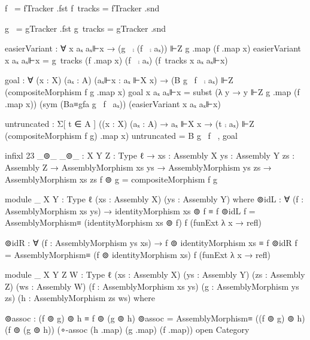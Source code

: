                              f~ = fTracker .fst
                             f~tracks = fTracker .snd

                             g~ = gTracker .fst
                             g~tracks = gTracker .snd

                             easierVariant : ∀ x aₓ aₓ⊩x → (g~ ⨾ (f~ ⨾ aₓ)) ⊩Z g .map (f .map x)
                             easierVariant x aₓ aₓ⊩x = g~tracks (f .map x) (f~ ⨾ aₓ) (f~tracks x aₓ aₓ⊩x)
                             
                             goal : ∀ (x : X) (aₓ : A) (aₓ⊩x : aₓ ⊩X x)
                                    → (B g~ f~ ⨾ aₓ) ⊩Z (compositeMorphism f g .map x)
                             goal x aₓ aₓ⊩x = subst (λ y → y ⊩Z g .map (f .map x))
                                                    (sym (Ba≡gfa g~ f~ aₓ))
                                                    (easierVariant x aₓ aₓ⊩x)

                             untruncated : Σ[ t ∈ A ]
                                           ((x : X) (aₓ : A)
                                           → aₓ ⊩X x
                                           → (t ⨾ aₓ) ⊩Z (compositeMorphism f g) .map x)
                             untruncated = B g~ f~ , goal
                             
  infixl 23 _⊚_
  _⊚_ : {X Y Z : Type ℓ} → {xs : Assembly X} {ys : Assembly Y} {zs : Assembly Z}
                         → AssemblyMorphism xs ys
                         → AssemblyMorphism ys zs
                         → AssemblyMorphism xs zs
  f ⊚ g = compositeMorphism f g

  module _ {X Y : Type ℓ} (xs : Assembly X) (ys : Assembly Y) where
    ⊚idL : ∀ (f : AssemblyMorphism xs ys) → identityMorphism xs ⊚ f ≡ f
    ⊚idL f = AssemblyMorphism≡ (identityMorphism xs ⊚ f) f (funExt λ x → refl)

    ⊚idR : ∀ (f : AssemblyMorphism ys xs) → f ⊚ identityMorphism xs ≡ f
    ⊚idR f = AssemblyMorphism≡ (f ⊚ identityMorphism xs) f (funExt λ x → refl)

  module _ {X Y Z W : Type ℓ}
           (xs : Assembly X)
           (ys : Assembly Y)
           (zs : Assembly Z)
           (ws : Assembly W)
           (f : AssemblyMorphism xs ys)
           (g : AssemblyMorphism ys zs)
           (h : AssemblyMorphism zs ws) where

         ⊚assoc : (f ⊚ g) ⊚ h ≡ f ⊚ (g ⊚ h)
         ⊚assoc = AssemblyMorphism≡ ((f ⊚ g) ⊚ h) (f ⊚ (g ⊚ h)) (∘-assoc (h .map) (g .map) (f .map))
  open Category
  
